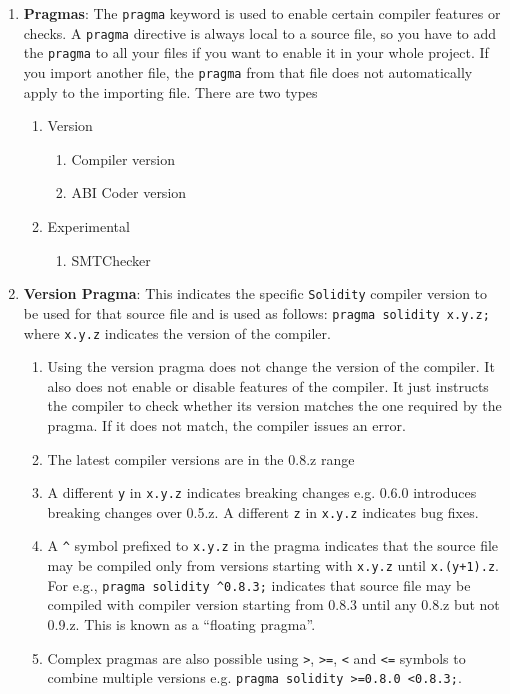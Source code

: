 \begin{enumerate}
\item\textbf{Pragmas}: The \verb|pragma| keyword is used to enable certain compiler features or checks. A \verb|pragma| directive is always local to a source file, so you have to add the \verb|pragma| to all your files if you want to enable it in your whole project. If you import another file, the \verb|pragma| from that file does not automatically apply to the importing file. There are two types
\begin{enumerate}
\item Version
    \begin{enumerate}
    \item Compiler version
    \item ABI Coder version
    \end{enumerate}
\item Experimental
    \begin{enumerate}
    \item SMTChecker
    \end{enumerate}
\end{enumerate}

\item\textbf{Version Pragma}: This indicates the specific \verb|Solidity| compiler version to be used for that source file and is used as follows: \verb|pragma solidity x.y.z;| where \verb|x.y.z| indicates the version of the compiler.
    \begin{enumerate}
    \item Using the version pragma does not change the version of the compiler. It also does not enable or disable features of the compiler. It just instructs the compiler to check whether its version matches the one required by the pragma. If it does not match, the compiler issues an error.
    \item The latest compiler versions are in the 0.8.z range
    \item A different \verb|y| in \verb|x.y.z| indicates breaking changes e.g. 0.6.0 introduces breaking changes over 0.5.z. A different \verb|z| in \verb|x.y.z| indicates bug fixes.
    \item A \verb|^| symbol prefixed to \verb|x.y.z| in the pragma indicates that the source file may be compiled only from versions starting with \verb|x.y.z| until \verb|x.(y+1).z|. For e.g., \verb|pragma solidity ^0.8.3;| indicates that source file may be compiled with compiler version starting from 0.8.3 until any 0.8.z but not 0.9.z. This is known as a “floating pragma”.
    \item Complex pragmas are also possible using \verb|>|, \verb|>=|, \verb|<| and \verb|<=| symbols to combine multiple versions e.g. \verb|pragma solidity >=0.8.0 <0.8.3;|.
    \end{enumerate}


\end{enumerate}
